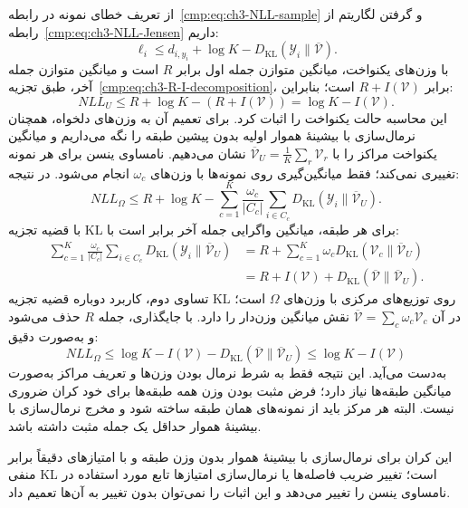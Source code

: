 از تعریف خطای نمونه در رابطه~\eqref{cmp:eq:ch3-NLL-sample} و گرفتن لگاریتم از رابطه~\eqref{cmp:eq:ch3-NLL-Jensen} داریم:
\[
\ell_i\le d_{i,y_i}+\log K-
D_{\mathrm{KL}}(\mathscr Y_i\|\overline{\mathcal V}).
\]
با وزن‌های یکنواخت، میانگین متوازن جمله اول برابر $R$ است و میانگین متوازن جمله آخر، طبق تجزیه~\eqref{cmp:eq:ch3-R-I-decomposition}، برابر $R+I(\mathcal V)$ است؛ بنابراین:
\[
NLL_U\le R+\log K-(R+I(\mathcal V))
=\log K-I(\mathcal V).
\]
این محاسبه حالت یکنواخت را اثبات کرد. برای تعمیم آن به وزن‌های دلخواه، همچنان نرمال‌سازی با بیشینهٔ هموار اولیه بدون پیشین طبقه را نگه می‌داریم و میانگین یکنواخت مراکز را با $\overline{\mathcal V}_U=\frac1K\sum_r\mathcal V_r$ نشان می‌دهیم. نامساوی ینسن برای هر نمونه تغییری نمی‌کند؛ فقط میانگین‌گیری روی نمونه‌ها با وزن‌های $\omega_c$ انجام می‌شود. در نتیجه:
\begin{equation}\label{eq:app-ch3-NLL-weighted-intermediate}
NLL_\Omega\le R+\log K-
\sum_{c=1}^{K}\frac{\omega_c}{|C_c|}
\sum_{i\in C_c}
D_{\mathrm{KL}}(\mathscr Y_i\|\overline{\mathcal V}_U).
\end{equation}
با قضیه تجزیه KL برای هر طبقه، میانگین واگرایی جمله آخر برابر است با:
\begin{equation}\label{eq:app-ch3-NLL-weighted-center-decomp}
\begin{aligned}
\sum_{c=1}^{K}\frac{\omega_c}{|C_c|}
\sum_{i\in C_c}
D_{\mathrm{KL}}(\mathscr Y_i\|\overline{\mathcal V}_U)
&=R+\sum_{c=1}^{K}\omega_c
D_{\mathrm{KL}}(\mathcal V_c\|\overline{\mathcal V}_U)\\
&=R+I(\mathcal V)
+D_{\mathrm{KL}}(\overline{\mathcal V}\|\overline{\mathcal V}_U).
\end{aligned}
\end{equation}
تساوی دوم، کاربرد دوباره قضیه تجزیه KL روی توزیع‌های مرکزی با وزن‌های $\Omega$ است؛ در آن
$\overline{\mathcal V}=\sum_c\omega_c\mathcal V_c$ نقش میانگین وزن‌دار را دارد. با جایگذاری، جمله $R$ حذف می‌شود و به‌صورت دقیق:
\[
NLL_\Omega\le\log K-I(\mathcal V)
-D_{\mathrm{KL}}(\overline{\mathcal V}\|\overline{\mathcal V}_U)
\le\log K-I(\mathcal V)
\]
به‌دست می‌آید. این نتیجه فقط به شرط نرمال بودن وزن‌ها و تعریف مراکز به‌صورت میانگین طبقه‌ها نیاز دارد؛ فرض مثبت بودن وزن همه طبقه‌ها برای خود کران ضروری نیست. البته هر مرکز باید از نمونه‌های همان طبقه ساخته شود و مخرج نرمال‌سازی با بیشینهٔ هموار حداقل یک جمله مثبت داشته باشد.

این کران برای نرمال‌سازی با بیشینهٔ هموار بدون وزن طبقه و با امتیازهای دقیقاً برابر منفی KL است؛ تغییر ضریب فاصله‌ها یا نرمال‌سازی امتیازها تابع مورد استفاده در نامساوی ینسن را تغییر می‌دهد و این اثبات را نمی‌توان بدون تغییر به آن‌ها تعمیم داد.



